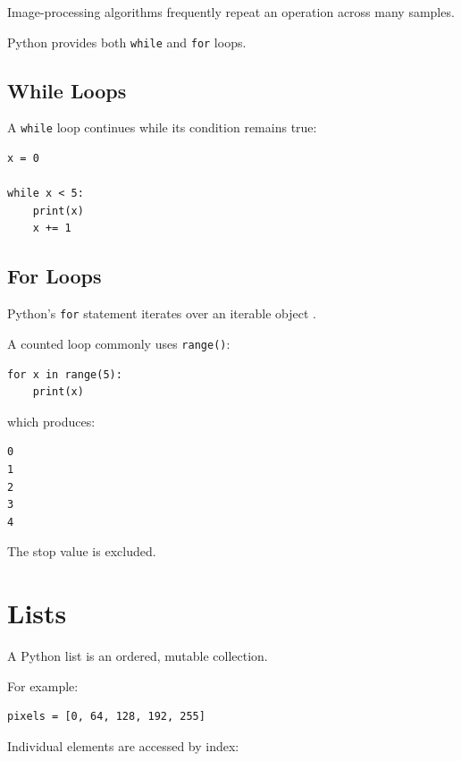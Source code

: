 Image-processing algorithms frequently repeat an operation across
many samples.

Python provides both \texttt{while} and
\texttt{for} loops.


\subsection{While Loops}

A \texttt{while} loop continues while its condition
remains true:

\begin{verbatim}
x = 0

while x < 5:
    print(x)
    x += 1
\end{verbatim}


\subsection{For Loops}

Python's \texttt{for} statement iterates over an iterable
object \cite{python_control_flow}.

A counted loop commonly uses \texttt{range()}:

\begin{verbatim}
for x in range(5):
    print(x)
\end{verbatim}

which produces:

\begin{verbatim}
0
1
2
3
4
\end{verbatim}

The stop value is excluded.


\section{Lists}
\label{sec:python-lists}

A Python list is an ordered, mutable collection.

For example:

\begin{verbatim}
pixels = [0, 64, 128, 192, 255]
\end{verbatim}

Individual elements are accessed by index:

